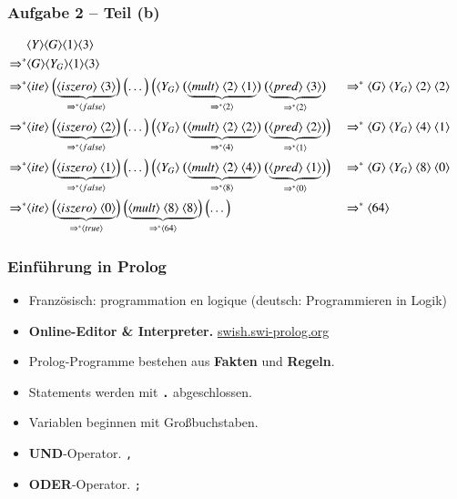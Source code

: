 \documentclass[aspectratio=1610,onlymath, ngerman]{beamer}
\renewcommand{\emph}[1]{\textbf{#1}}
\newcommand{\num}[1]{\ensuremath{\langle #1 \rangle}}
\begin{document}
	\begin{frame} \frametitle{Aufgabe 2 -- Teil (b)}
	\small
		\begin{alignat*}{2}
		&\num{Y} \num{G} \num{1} \num{3} \\
		\Rightarrow^\ast &\num{G} \num{Y_G} \num{1} \num{3} \\
		\Rightarrow^\ast 
		&\num{ite} \ 
		\Bigl( \underbrace{\num{iszero} \ \num{3}}_{\Rightarrow^\ast \num{false}} \Bigr) \ \Bigl( \dots \Bigr) \ \Bigl( \num{Y_G} \ \bigl( \underbrace{\num{mult} \ \num{2} \ \num{1}}_{\Rightarrow^\ast \num{2}} \bigr) \ \bigl(\underbrace{\num{pred} \ \num{3}}_{\Rightarrow^\ast \num{2}} \bigr) 
		&&\Rightarrow^\ast 
		\num{G} \ \num{Y_G} \ \num{2} \ \num{2} \\
		\Rightarrow^\ast 
		&\num{ite} \ 
		\Bigl( \underbrace{\num{iszero} \ \num{2}}_{\Rightarrow^\ast \num{false}} \Bigr) \ \Bigl( \dots \Bigr) \ \Bigl( \num{Y_G} \ \bigl( \underbrace{\num{mult} \ \num{2} \ \num{2}}_{\Rightarrow^\ast \num{4}} \bigr) \ \bigl(\underbrace{\num{pred} \ \num{2}}_{\Rightarrow^\ast \num{1}} \bigr) \Bigr)
		&&\Rightarrow^\ast 
		\num{G} \ \num{Y_G} \ \num{4} \ \num{1} \\
		\Rightarrow^\ast 
		&\num{ite} \ 
		\Bigl( \underbrace{\num{iszero} \ \num{1}}_{\Rightarrow^\ast \num{false}} \Bigr) \ \Bigl( \dots \Bigr) \ \Bigl( \num{Y_G} \ \bigl( \underbrace{\num{mult} \ \num{2} \ \num{4}}_{\Rightarrow^\ast \num{8}} \bigr) \ \bigl(\underbrace{\num{pred} \ \num{1}}_{\Rightarrow^\ast \num{0}} \bigr) \Bigr)
		&&\Rightarrow^\ast
		\num{G} \ \num{Y_G} \ \num{8} \ \num{0} \\
		\Rightarrow^\ast
		&\num{ite} \ 
		\Bigl( \underbrace{\num{iszero} \ \num{0}}_{\Rightarrow^\ast \num{true}} \Bigr) \ \Bigl( \underbrace{\num{mult} \ \num{8} \ \num{8}}_{\Rightarrow^\ast \num{64}} \Bigr) \ \Bigl( \dots \Bigr)
		&&\Rightarrow^\ast \num{64}
		\end{alignat*}
	\end{frame}	

	\begin{frame} \frametitle{Einführung in Prolog}
	\small
		\begin{itemize}
			\item Französisch: programmation en logique
			(deutsch: Programmieren in Logik)
			\item \emph{Online-Editor \& Interpreter.} \url{swish.swi-prolog.org}
			\item Prolog-Programme bestehen aus \emph{Fakten} und \emph{Regeln}.
			\bigskip
			\item Statements werden mit \emph{\texttt{.}} abgeschlossen.
			\item Variablen beginnen mit Großbuchstaben.
			\bigskip
			\item \emph{UND}-Operator. \hspace{.2cm} \texttt{,}
			\item \emph{ODER}-Operator.\hspace{.2cm} \texttt{;}
		\end{itemize}
	\end{frame}
\end{document}
